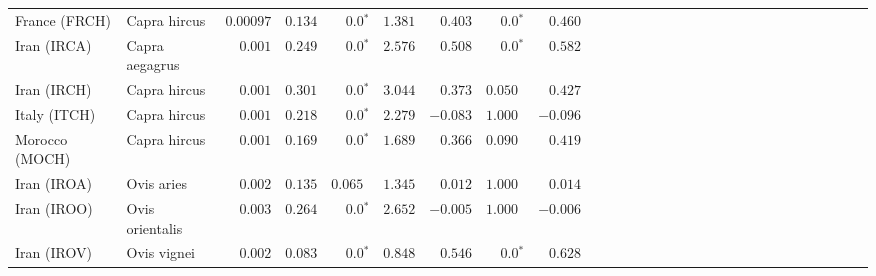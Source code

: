 \begin{center}
\begin{adjustbox}{width = 1\textwidth}
\begin{tabular}{|l|l|r|r|r|r|r|r|r|r|r|r|r|r|r|r|r|r|r|r|r|r|r|r|r|r|r|r|r|}
                  France (FRCH) &         Capra hircus &          $0.00097$ &                      $ 0.134$ &                  $\bm{0.0{^*}}$ &                                           $ 1.381$ &                      $ 0.403$ &                  $\bm{0.0{^*}}$ &                                           $ 0.460$ \\
                    Iran (IRCA) &       Capra aegagrus &           $ 0.001$ &                      $ 0.249$ &                  $\bm{0.0{^*}}$ &                                           $ 2.576$ &                      $ 0.508$ &                  $\bm{0.0{^*}}$ &                                           $ 0.582$ \\
                    Iran (IRCH) &         Capra hircus &           $ 0.001$ &                      $ 0.301$ &                  $\bm{0.0{^*}}$ &                                           $ 3.044$ &                      $ 0.373$ &                      $ 0.050~~$ &                                           $ 0.427$ \\
                   Italy (ITCH) &         Capra hircus &           $ 0.001$ &                      $ 0.218$ &                  $\bm{0.0{^*}}$ &                                           $ 2.279$ &                      $-0.083$ &                      $ 1.000~~$ &                                           $-0.096$ \\
                 Morocco (MOCH) &         Capra hircus &           $ 0.001$ &                      $ 0.169$ &                  $\bm{0.0{^*}}$ &                                           $ 1.689$ &                      $ 0.366$ &                      $ 0.090~~$ &                                           $ 0.419$ \\
                    Iran (IROA) &           Ovis aries &           $ 0.002$ &                      $ 0.135$ &                      $ 0.065~~$ &                                           $ 1.345$ &                      $ 0.012$ &                      $ 1.000~~$ &                                           $ 0.014$ \\
                    Iran (IROO) &      Ovis orientalis &           $ 0.003$ &                      $ 0.264$ &                  $\bm{0.0{^*}}$ &                                           $ 2.652$ &                      $-0.005$ &                      $ 1.000~~$ &                                           $-0.006$ \\
                    Iran (IROV) &          Ovis vignei &           $ 0.002$ &                      $ 0.083$ &                  $\bm{0.0{^*}}$ &                                           $ 0.848$ &                      $ 0.546$ &                  $\bm{0.0{^*}}$ &                                           $ 0.628$ \\

\end{tabular}
\end{adjustbox}
\end{center}
